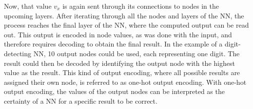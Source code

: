 Now, that value $v_x$ is again sent through its connections to nodes in the upcoming layers.
After iterating through all the nodes and layers of the NN, the process reaches the final layer of the NN, where the computed output can be read out.
This output is encoded in node values, as was done with the input, and therefore requires decoding to obtain the final result.
In the example of a digit-detecting NN, 10 output nodes could be used, each representing one digit.
The result could then be decoded by identifying the output node with the highest value as the result.
This kind of output encoding, where all possible results are assigned their own node, is referred to as one-hot output encoding.\cite{Brownlee2020}
With one-hot output encoding, the values of the output nodes can be interpreted as the certainty of a NN for a specific result to be correct.

